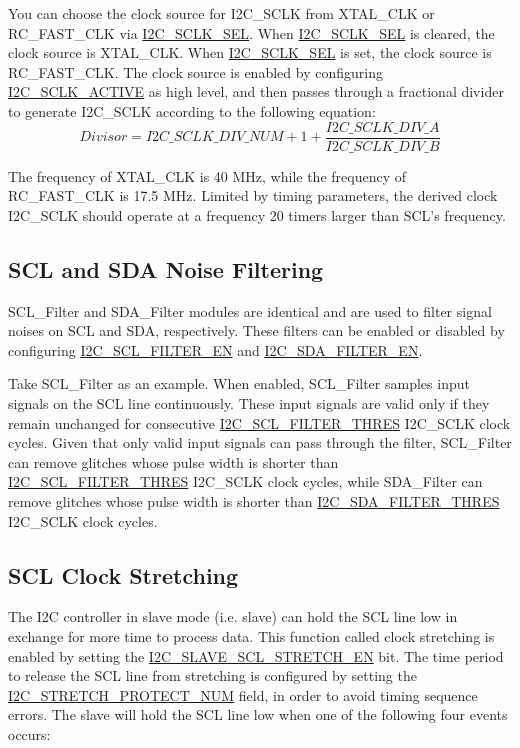 \documentclass[main\_\_EN.tex]{subfiles}
\begin{document}
You can choose the clock source for I2C\_SCLK from XTAL\_CLK or RC\_FAST\_CLK via \hyperref[fielddesc:I2CSCLKSEL]{I2C\_SCLK\_SEL}. When \hyperref[fielddesc:I2CSCLKSEL]{I2C\_SCLK\_SEL} is cleared, the clock source is XTAL\_CLK. When \hyperref[fielddesc:I2CSCLKSEL]{I2C\_SCLK\_SEL} is set, the clock source is RC\_FAST\_CLK. The clock source is enabled by configuring \hyperref[fielddesc:I2CSCLKACTIVE]{I2C\_SCLK\_ACTIVE} as high level, and then passes through a fractional divider to generate I2C\_SCLK according to the following equation:
\[
Divisor = I2C\_SCLK\_DIV\_ NUM + 1+\frac{ \hyperref[fielddesc:I2CSCLKDIVA]{I2C\_SCLK\_DIV\_A}}{\hyperref[fielddesc:I2CSCLKDIVB]{I2C\_SCLK\_DIV\_B}}
\]

The frequency of XTAL\_CLK is 40 MHz, while the frequency of RC\_FAST\_CLK is 17.5 MHz. Limited by timing parameters, the derived clock I2C\_SCLK should operate at a frequency 20 timers larger than SCL's frequency.

\subsection{SCL and SDA Noise Filtering}
SCL\_Filter and SDA\_Filter modules are identical and are used to filter signal noises on SCL and SDA, respectively. These filters can be enabled or disabled by configuring \hyperref[fielddesc:I2CSCLFILTEREN]{I2C\_SCL\_FILTER\_EN} and \hyperref[fielddesc:I2CSDAFILTEREN]{I2C\_SDA\_FILTER\_EN}.

Take SCL\_Filter as an example. When enabled, SCL\_Filter samples input signals on the SCL line continuously. These input signals are valid only if they remain unchanged for consecutive \hyperref[fielddesc:I2CSCLFILTERTHRES]{I2C\_SCL\_FILTER\_THRES} I2C\_SCLK clock cycles. Given that only valid input signals can pass through the filter, SCL\_Filter can remove glitches whose pulse width is shorter than \hyperref[fielddesc:I2CSCLFILTERTHRES]{I2C\_SCL\_FILTER\_THRES} I2C\_SCLK clock cycles, while SDA\_Filter can remove glitches whose pulse width is shorter than \hyperref[fielddesc:I2CSDAFILTERTHRES]{I2C\_SDA\_FILTER\_THRES} I2C\_SCLK clock cycles.

\subsection{SCL Clock Stretching}
The I2C controller in slave mode (i.e. slave) can hold the SCL line low in exchange for more time to process data. This function called clock stretching is enabled by setting the \hyperref[fielddesc:I2CSLAVESCLSTRETCHEN]{I2C\_SLAVE\_SCL\_STRETCH\_EN} bit. The time period to release the SCL line from stretching is configured by setting the \hyperref[fielddesc:I2CSTRETCHPROTECTNUM]{I2C\_STRETCH\_PROTECT\_NUM} field, in order to avoid timing sequence errors.
The slave will hold the SCL line low when one of the following four events occurs:
\end{document}
